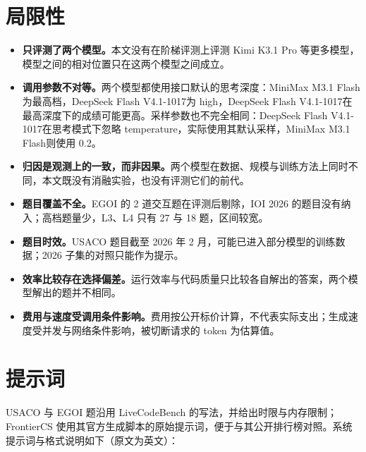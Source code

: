 \documentclass[11pt,a4paper,fontset=none]{ctexart}
\newcommand{\ds}{DeepSeek Flash V4.1-1017}
\newcommand{\mini}{MiniMax M3.1 Flash}
\newcommand{\lead}[1]{\textbf{#1}\quad}
\begin{document}
\section*{局限性}

\begin{itemize}[leftmargin=1.6em]
  \item \lead{只评测了两个模型。}本文没有在阶梯评测上评测 Kimi K3.1 Pro 等更多模型，模型之间的相对位置只在这两个模型之间成立。
  \item \lead{调用参数不对等。}两个模型都使用接口默认的思考深度：\mini 为最高档，\ds 为 high，\ds 在最高深度下的成绩可能更高。采样参数也不完全相同：\ds 在思考模式下忽略 temperature，实际使用其默认采样，\mini 则使用 0.2。
  \item \lead{归因是观测上的一致，而非因果。}两个模型在数据、规模与训练方法上同时不同，本文既没有消融实验，也没有评测它们的前代。
  \item \lead{题目覆盖不全。}EGOI 的 2 道交互题在评测后剔除，IOI 2026 的题目没有纳入；高档题量少，L3、L4 只有 27 与 18 题，区间较宽。
  \item \lead{题目时效。}USACO 题目截至 2026 年 2 月，可能已进入部分模型的训练数据；2026 子集的对照只能作为提示。
  \item \lead{效率比较存在选择偏差。}运行效率与代码质量只比较各自解出的答案，两个模型解出的题并不相同。
  \item \lead{费用与速度受调用条件影响。}费用按公开标价计算，不代表实际支出；生成速度受并发与网络条件影响，被切断请求的 token 为估算值。
\end{itemize}




\appendix
\section{提示词}
\label{app:prompts}

USACO 与 EGOI 题沿用 LiveCodeBench 的写法，并给出时限与内存限制；FrontierCS 使用其官方生成脚本的原始提示词，便于与其公开排行榜对照。系统提示词与格式说明如下（原文为英文）：
\end{document}
